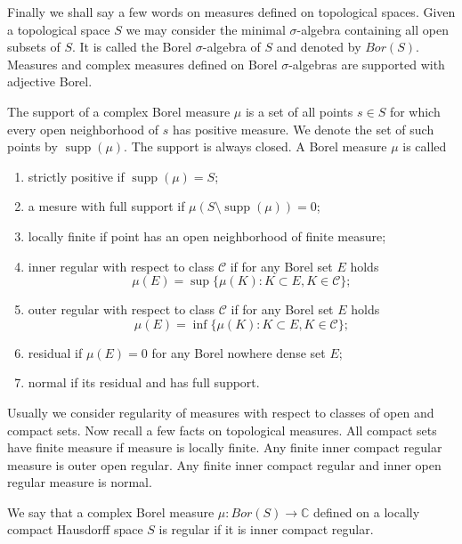 Finally we shall say a few words on measures defined on topological spaces.
Given a topological space $S$ we may consider the minimal $\sigma$-algebra
containing all open subsets of $S$. It is called the Borel $\sigma$-algebra of
$S$ and denoted by $Bor(S)$. Measures and complex measures defined on Borel
$\sigma$-algebras are supported with adjective Borel.

The support of a complex Borel measure $\mu$ is a set of all points
$s\in S$ for which every open neighborhood of $s$ has positive measure. We
denote the set of such points by $\operatorname{supp}(\mu)$. The support is
always closed. A Borel measure $\mu$ is called
\begin{enumerate}[label = (\roman*)]
  \item strictly positive if $\operatorname{supp}(\mu)=S$;

  \item a mesure with full support 
  if $\mu(S\setminus\operatorname{supp}(\mu))=0$;

  \item locally finite if point has an open neighborhood of finite measure; 

  \item inner regular with respect to 
  class $\mathcal{C}$ if for any Borel set $E$ holds 
  $$
  \mu(E)=\sup \{\mu(K): K\subset E, K\in\mathcal{C} \};
  $$

  \item outer regular with respect to 
  class $\mathcal{C}$ if for any Borel set $E$ holds 
  $$
  \mu(E)=\inf \{\mu(K): K\subset E, K\in\mathcal{C} \};
  $$

  \item residual if $\mu(E)=0$ for any Borel nowhere dense set $E$;

  \item normal if its residual and has full support.
\end{enumerate}

Usually we consider regularity of measures with respect to classes of open and
compact sets. Now recall a few facts on topological measures. All compact sets 
have finite measure if measure is locally finite. Any finite inner compact 
regular measure is outer open regular. Any finite inner compact regular and
inner open regular measure is normal. 

We say that a complex Borel measure $\mu:Bor(S)\to\mathbb{C}$ defined on a 
locally compact Hausdorff space $S$ is regular if it is inner compact regular.  

